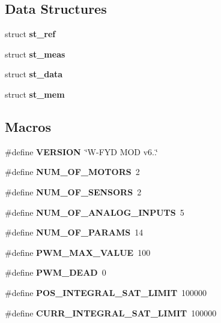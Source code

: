 \subsection*{Data Structures}
\begin{DoxyCompactItemize}
\item 
struct \textbf{ st\+\_\+ref}
\item 
struct \textbf{ st\+\_\+meas}
\item 
struct \textbf{ st\+\_\+data}
\item 
struct \textbf{ st\+\_\+mem}
\end{DoxyCompactItemize}
\subsection*{Macros}
\begin{DoxyCompactItemize}
\item 
\mbox{\label{globals_8h_a1c6d5de492ac61ad29aec7aa9a436bbf}} 
\#define {\bfseries V\+E\+R\+S\+I\+ON}~\char`\"{}W-\/F\+YD M\+OD v6..\char`\"{}
\item 
\mbox{\label{globals_8h_a39ac50737c1ee7d5b723b2597fdf6f26}} 
\#define {\bfseries N\+U\+M\+\_\+\+O\+F\+\_\+\+M\+O\+T\+O\+RS}~2
\item 
\mbox{\label{globals_8h_af48a6b6fcdc5f5019fb108d03b07a727}} 
\#define {\bfseries N\+U\+M\+\_\+\+O\+F\+\_\+\+S\+E\+N\+S\+O\+RS}~2
\item 
\mbox{\label{globals_8h_a181be7cbd0b2da8e8bb809e6313bd67f}} 
\#define {\bfseries N\+U\+M\+\_\+\+O\+F\+\_\+\+A\+N\+A\+L\+O\+G\+\_\+\+I\+N\+P\+U\+TS}~5
\item 
\mbox{\label{globals_8h_aab4f4a0ece20c4bc27152bd72926d89c}} 
\#define {\bfseries N\+U\+M\+\_\+\+O\+F\+\_\+\+P\+A\+R\+A\+MS}~14
\item 
\mbox{\label{globals_8h_aafe0521fa22763b7afc50e12d31b450d}} 
\#define {\bfseries P\+W\+M\+\_\+\+M\+A\+X\+\_\+\+V\+A\+L\+UE}~100
\item 
\mbox{\label{globals_8h_ada72214f9e15f255cad72a749211b3df}} 
\#define {\bfseries P\+W\+M\+\_\+\+D\+E\+AD}~0
\item 
\mbox{\label{globals_8h_ad252b8b0421e545cce8ba0548a6ca4ed}} 
\#define {\bfseries P\+O\+S\+\_\+\+I\+N\+T\+E\+G\+R\+A\+L\+\_\+\+S\+A\+T\+\_\+\+L\+I\+M\+IT}~100000
\item 
\mbox{\label{globals_8h_a94ec4e208ccec9fc13d0f57094f6de35}} 
\#define {\bfseries C\+U\+R\+R\+\_\+\+I\+N\+T\+E\+G\+R\+A\+L\+\_\+\+S\+A\+T\+\_\+\+L\+I\+M\+IT}~100000
\item 
\mbox{\label{globals_8h_aff0004301ad937f09b58d17ff3f8c9b3}} 

\end{DoxyCompactItemize}
